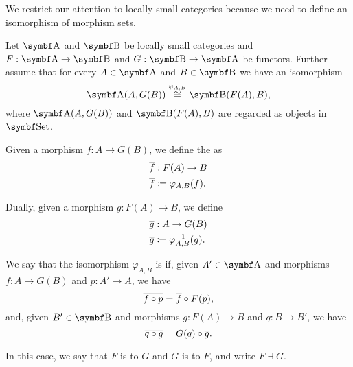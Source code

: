 \begin{remark}
  We restrict our attention to locally small categories because we need to define an isomorphism of morphism sets.
\end{remark}
\begin{definition}\label{def:adjoint_functor}\cite[definition 2.1.1]{Leinster2014}
  Let \( \Bold A \) and \( \Bold B \) be locally small categories and \( F: \Bold A \to \Bold B \) and \( G: \Bold B \to \Bold A \) be functors. Further assume that for every \( A \in \Bold A \) and \( B \in \Bold B \) we have an isomorphism
  \begin{equation*}
    \Cat{A}(A, G(B)) \overset {\varphi_{A, B}} {\cong} \Bold{B}(F(A), B),
  \end{equation*}
  where \( \Cat{A}(A, G(B)) \) and \( \Bold{B}(F(A), B) \) are regarded as objects in \( \Bold{Set} \).

  Given a morphism \( f: A \to G(B) \), we define the  as
  \begin{align*}
    &\overline{f}: F(A) \to B \\
    &\overline{f} \coloneqq \varphi_{A, B} (f).
  \end{align*}

  Dually, given a morphism \( g: F(A) \to B \), we define
  \begin{align*}
    &\overline{g}: A \to G(B) \\
    &\overline{g} \coloneqq \varphi_{A, B}^{-1} (g).
  \end{align*}

  We say that the isomorphism \( \varphi_{A, B} \) is  if,  given \( A' \in \Bold A \) and morphisms \( f: A \to G(B) \) and \( p: A' \to A \), we have
  \begin{equation*}
    \overline{f \circ p} = \overline{f} \circ F(p),
  \end{equation*}
  and, given \( B' \in \Bold B \) and morphisms \( g: F(A) \to B \) and \( q: B \to B' \), we have
  \begin{equation*}
    \overline{q \circ g} = G(q) \circ \overline{g}.
  \end{equation*}

  In this case, we say that \( F \) is  to \( G \) and \( G \) is  to \( F \), and write \( F \dashv G \).
\end{definition}

